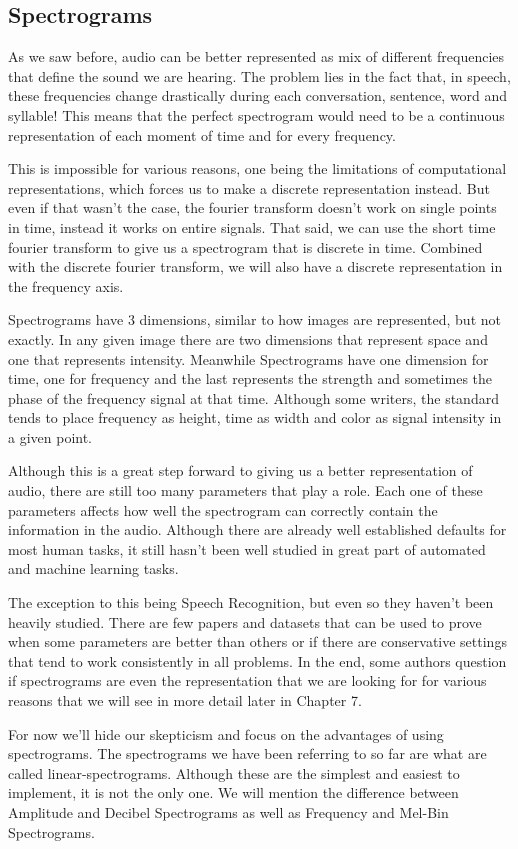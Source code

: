 \documentclass{book}
\begin{document}
\begin{appendices}
\chapter{Spectrograms}
\qquad As we saw before, audio can be better represented as mix of different frequencies that define the sound we are hearing. The problem lies in the fact that, in speech, these frequencies change drastically during each conversation, sentence, word and syllable! This means that the perfect spectrogram would need to be a continuous representation of each moment of time and for every frequency.
\par
This is impossible for various reasons, one being the limitations of computational representations, which forces us to make a discrete representation instead. But even if that wasn’t the case, the fourier transform doesn’t work on single points in time, instead it works on entire signals. That said, we can use the short time fourier transform to give us a spectrogram that is discrete in time. Combined with the discrete fourier transform, we will also have a discrete representation in the frequency axis.
\par
Spectrograms have 3 dimensions, similar to how images are represented, but not exactly. In any given image there are two dimensions that represent space and one that represents intensity. Meanwhile Spectrograms have one dimension for time, one for frequency and the last represents the strength and sometimes the phase of the frequency signal at that time. Although some writers, the standard tends to place frequency as height, time as width and color as signal intensity in a given point.
\par
Although this is a great step forward to giving us a better representation of audio, there are still too many parameters that play a role. Each one of these parameters affects how well the spectrogram can correctly contain the information in the audio. Although there are already well established defaults for most human tasks, it still hasn’t been well studied in great part of automated and machine learning tasks.
\par
The exception to this being Speech Recognition, but even so they haven’t been heavily studied. There are few papers and datasets that can be used to prove when some parameters are better than others or if there are conservative settings that tend to work consistently in all problems. In the end, some authors question if spectrograms are even the representation that we are looking for for various reasons that we will see in more detail later in Chapter 7.
\par
For now we'll hide our skepticism and focus on the advantages of using spectrograms. The spectrograms we have been referring to so far are what are called linear-spectrograms. Although these are the simplest and easiest to implement, it is not the only one. We will mention the difference between Amplitude and Decibel Spectrograms as well as Frequency and Mel-Bin Spectrograms.

\end{appendices}
\end{document}
